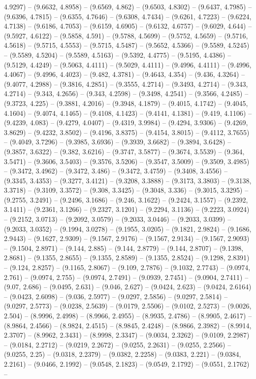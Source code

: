 4.9297) -- (9.6632, 4.8958) -- (9.6569, 4.862) -- (9.6503, 4.8302) -- (9.6437, 4.7985) -- (9.6396, 4.7815) -- (9.6355, 4.7646) -- (9.6308, 4.7434) -- (9.6261, 4.7223) -- (9.6224, 4.7138) -- (9.6186, 4.7053) -- (9.6159, 4.6905) -- (9.6132, 4.6757) -- (9.6029, 4.644) -- (9.5927, 4.6122) -- (9.5858, 4.591) -- (9.5788, 4.5699) -- (9.5752, 4.5659) -- (9.5716, 4.5618) -- (9.5715, 4.5553) -- (9.5715, 4.5487) -- (9.5652, 4.5366) -- (9.5589, 4.5245) -- (9.5589, 4.5204) -- (9.5589, 4.5163) -- (9.5392, 4.4775) -- (9.5195, 4.4386) -- (9.5129, 4.4249) -- (9.5063, 4.4111) -- (9.5029, 4.4111) -- (9.4996, 4.4111) -- (9.4996, 4.4067) -- (9.4996, 4.4023) -- (9.482, 4.3781) -- (9.4643, 4.354) -- (9.436, 4.3264) -- (9.4077, 4.2988) -- (9.3816, 4.2851) -- (9.3555, 4.2714) -- (9.3493, 4.2714) -- (9.343, 4.2714) -- (9.343, 4.2656) -- (9.343, 4.2598) -- (9.3498, 4.2541) -- (9.3566, 4.2485) -- (9.3723, 4.225) -- (9.3881, 4.2016) -- (9.3948, 4.1879) -- (9.4015, 4.1742) -- (9.4045, 4.1604) -- (9.4074, 4.1465) -- (9.4108, 4.1423) -- (9.4141, 4.1381) -- (9.419, 4.1106) -- (9.4239, 4.083) -- (9.4279, 4.0407) -- (9.4319, 3.9984) -- (9.4294, 3.9306) -- (9.4269, 3.8629) -- (9.4232, 3.8502) -- (9.4196, 3.8375) -- (9.4154, 3.8015) -- (9.4112, 3.7655) -- (9.4049, 3.7296) -- (9.3985, 3.6936) -- (9.3939, 3.6682) -- (9.3894, 3.6428) -- (9.3857, 3.6322) -- (9.382, 3.6216) -- (9.3747, 3.5877) -- (9.3674, 3.5539) -- (9.364, 3.5471) -- (9.3606, 3.5403) -- (9.3576, 3.5206) -- (9.3547, 3.5009) -- (9.3509, 3.4985) -- (9.3472, 3.4962) -- (9.3472, 3.486) -- (9.3472, 3.4759) -- (9.3408, 3.4556) -- (9.3345, 3.4353) -- (9.3277, 3.4121) -- (9.3208, 3.3888) -- (9.3173, 3.3803) -- (9.3138, 3.3718) -- (9.3109, 3.3572) -- (9.308, 3.3425) -- (9.3048, 3.336) -- (9.3015, 3.3295) -- (9.2755, 3.2491) -- (9.2496, 3.1686) -- (9.246, 3.1622) -- (9.2424, 3.1557) -- (9.2392, 3.1411) -- (9.2361, 3.1266) -- (9.2327, 3.1201) -- (9.2294, 3.1136) -- (9.2223, 3.0924) -- (9.2152, 3.0713) -- (9.2092, 3.0579) -- (9.2033, 3.0446) -- (9.2033, 3.0399) -- (9.2033, 3.0352) -- (9.1994, 3.0278) -- (9.1955, 3.0205) -- (9.1821, 2.9824) -- (9.1686, 2.9443) -- (9.1627, 2.9309) -- (9.1567, 2.9176) -- (9.1567, 2.9134) -- (9.1567, 2.9093) -- (9.1504, 2.8971) -- (9.144, 2.885) -- (9.144, 2.8779) -- (9.144, 2.8707) -- (9.1398, 2.8681) -- (9.1355, 2.8655) -- (9.1355, 2.8589) -- (9.1355, 2.8524) -- (9.1298, 2.8391) -- (9.124, 2.8257) -- (9.1165, 2.8067) -- (9.109, 2.7876) -- (9.1032, 2.7743) -- (9.0974, 2.761) -- (9.0974, 2.755) -- (9.0974, 2.7491) -- (9.0939, 2.7451) -- (9.0904, 2.7411) -- (9.07, 2.686) -- (9.0495, 2.631) -- (9.046, 2.627) -- (9.0424, 2.623) -- (9.0424, 2.6164) -- (9.0423, 2.6098) -- (9.036, 2.5977) -- (9.0297, 2.5856) -- (9.0297, 2.5814) -- (9.0297, 2.5773) -- (9.0238, 2.5639) -- (9.0179, 2.5506) -- (9.0102, 2.5273) -- (9.0026, 2.504) -- (8.9996, 2.4998) -- (8.9966, 2.4955) -- (8.9935, 2.4786) -- (8.9905, 2.4617) -- (8.9864, 2.4566) -- (8.9824, 2.4515) -- (8.9845, 2.4248) -- (8.9866, 2.3982) -- (8.9914, 2.3707) -- (8.9962, 2.3431) -- (8.9998, 2.3347) -- (9.0034, 2.3262) -- (9.0109, 2.2987) -- (9.0184, 2.2712) -- (9.0219, 2.2672) -- (9.0255, 2.2631) -- (9.0255, 2.2566) -- (9.0255, 2.25) -- (9.0318, 2.2379) -- (9.0382, 2.2258) -- (9.0383, 2.221) -- (9.0384, 2.2161) -- (9.0466, 2.1992) -- (9.0548, 2.1823) -- (9.0549, 2.1792) -- (9.0551, 2.1762) -- 